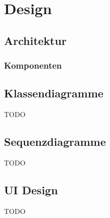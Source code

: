 
\section{Design}
\label{sec:Design}

\subsection{Architektur}
\label{sub:Architektur}

\subsubsection{Komponenten}
\label{subsub:Komponenten}


\subsection{Klassendiagramme}
\label{sub:Klassendiagramme}

TODO

\subsection{Sequenzdiagramme}
\label{sub:Sequenzdiagramme}

TODO

\subsection{UI Design}
\label{sub:UI Design}

TODO
